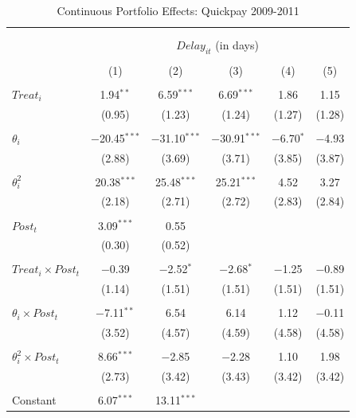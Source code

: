 \documentclass[
]{article}
\begin{document}
\begin{table}[H] \centering 
  \caption{Continuous Portfolio Effects: Quickpay 2009-2011} 
  \label{} 
\small 
\begin{tabular}{@{\extracolsep{-2pt}}lccccc} 
\\[-1.8ex]\hline 
\hline \\[-1.8ex] 
\\[-1.8ex] & \multicolumn{5}{c}{$Delay_{it}$ (in days)} \\ 
\\[-1.8ex] & (1) & (2) & (3) & (4) & (5)\\ 
\hline \\[-1.8ex] 
 $Treat_i$ & 1.94$^{**}$ & 6.59$^{***}$ & 6.69$^{***}$ & 1.86 & 1.15 \\ 
  & (0.95) & (1.23) & (1.24) & (1.27) & (1.28) \\ 
  & & & & & \\ 
 $\theta_i$ & $-$20.45$^{***}$ & $-$31.10$^{***}$ & $-$30.91$^{***}$ & $-$6.70$^{*}$ & $-$4.93 \\ 
  & (2.88) & (3.69) & (3.71) & (3.85) & (3.87) \\ 
  & & & & & \\ 
 $\theta_i^2$ & 20.38$^{***}$ & 25.48$^{***}$ & 25.21$^{***}$ & 4.52 & 3.27 \\ 
  & (2.18) & (2.71) & (2.72) & (2.83) & (2.84) \\ 
  & & & & & \\ 
 $Post_t$ & 3.09$^{***}$ & 0.55 &  &  &  \\ 
  & (0.30) & (0.52) &  &  &  \\ 
  & & & & & \\ 
 $Treat_i \times Post_t$ & $-$0.39 & $-$2.52$^{*}$ & $-$2.68$^{*}$ & $-$1.25 & $-$0.89 \\ 
  & (1.14) & (1.51) & (1.51) & (1.51) & (1.51) \\ 
  & & & & & \\ 
 $\theta_i \times Post_t$ & $-$7.11$^{**}$ & 6.54 & 6.14 & 1.12 & $-$0.11 \\ 
  & (3.52) & (4.57) & (4.59) & (4.58) & (4.58) \\ 
  & & & & & \\ 
 $\theta_i^2 \times Post_t$ & 8.66$^{***}$ & $-$2.85 & $-$2.28 & 1.10 & 1.98 \\ 
  & (2.73) & (3.42) & (3.43) & (3.42) & (3.42) \\ 
  & & & & & \\ 
 Constant & 6.07$^{***}$ & 13.11$^{***}$ &  &  &  \\ 

\end{tabular}
\end{table}
\end{document}
